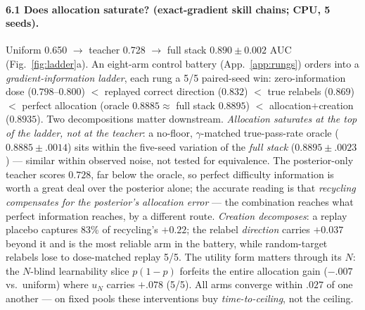 \paragraph{6.1 Does allocation saturate? (exact-gradient skill chains; CPU, 5 seeds).} Uniform 0.650
$\to$ teacher 0.728 $\to$ full stack $\mathbf{0.890 \pm 0.002}$ AUC
(Fig.~\ref{fig:ladder}a). An
eight-arm control battery (App.~\ref{app:rungs}) orders into a
\emph{gradient-information ladder}, each rung a 5/5 paired-seed win:
zero-information dose ($0.798$--$0.800$) $<$ replayed correct direction
($0.832$) $<$ true relabels ($0.869$) $<$ perfect allocation (oracle
$0.8885 \approx$ full stack $0.8895$) $<$ allocation$+$creation
($0.8935$). Two decompositions matter downstream. \emph{Allocation
saturates at the top of the ladder, not at the teacher}: a no-floor,
$\gamma$-matched true-pass-rate oracle ($0.8885{\pm}.0014$) sits
within the five-seed variation of the \emph{full stack}
($0.8895{\pm}.0023$) --- similar within observed noise, not tested for
equivalence. The posterior-only teacher scores $0.728$, far below the
oracle, so perfect difficulty information is worth a great deal over
the posterior alone; the accurate reading is that \emph{recycling
compensates for the posterior's allocation error} --- the combination
reaches what perfect information reaches, by a different route. \emph{Creation decomposes}: a replay
placebo captures 83\% of recycling's $+0.22$; the relabel
\emph{direction} carries $+0.037$ beyond it and is the most reliable
arm in the battery, while random-target relabels lose to dose-matched
replay 5/5. The utility form matters through its $N$: the
$N$-blind learnability slice $p(1{-}p)$ forfeits the entire allocation
gain ($-.007$ vs.\ uniform) where $u_N$ carries $+.078$ (5/5). All
arms converge within $.027$ of one another --- on fixed pools these
interventions buy \emph{time-to-ceiling}, not the ceiling.

